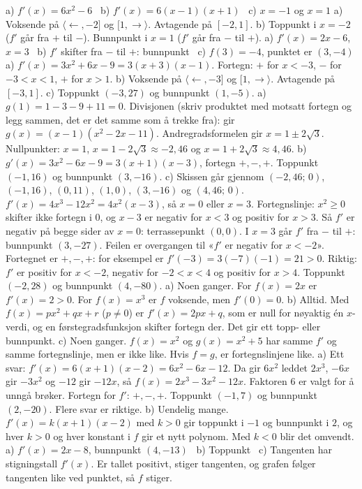 
 a) $f'(x) = 6x^2 - 6$ \ b) $f'(x) = 6(x - 1)(x + 1)$ \ c) $x = -1$ og $x = 1$
 a) Voksende på $\langle\leftarrow, -2]$ og $[1, \rightarrow\rangle$. Avtagende på $[-2, 1]$.
b) Toppunkt i $x = -2$ ($f'$ går fra $+$ til $-$). Bunnpunkt i $x = 1$ ($f'$ går fra $-$ til $+$).
 a) $f'(x) = 2x - 6$, $x = 3$ \ b) $f'$ skifter fra $-$ til $+$: bunnpunkt \ c) $f(3) = -4$, punktet er $(3, -4)$
 a) $f'(x) = 3x^2 + 6x - 9 = 3(x + 3)(x - 1)$. Fortegn: $+$ for $x < -3$, $-$ for $-3 < x < 1$, $+$ for $x > 1$.
b) Voksende på $\langle\leftarrow, -3]$ og $[1, \rightarrow\rangle$. Avtagende på $[-3, 1]$.
c) Toppunkt $(-3, 27)$ og bunnpunkt $(1, -5)$.
 a) $g(1) = 1 - 3 - 9 + 11 = 0$. Divisjonen (skriv produktet med motsatt fortegn og legg sammen, det er det samme som å trekke fra):
{\small{}}
gir $g(x) = (x - 1)(x^2 - 2x - 11)$. Andregradsformelen gir $x = 1 \pm 2\sqrt{3}$.
Nullpunkter: $x = 1$, $x = 1 - 2\sqrt{3} \approx -2,46$ og $x = 1 + 2\sqrt{3} \approx 4,46$.
b) $g'(x) = 3x^2 - 6x - 9 = 3(x + 1)(x - 3)$, fortegn $+, -, +$. Toppunkt $(-1, 16)$ og bunnpunkt $(3, -16)$.
c) Skissen går gjennom $(-2,46;\,0)$, $(-1, 16)$, $(0, 11)$, $(1, 0)$, $(3, -16)$ og $(4,46;\,0)$.
 $f'(x) = 4x^3 - 12x^2 = 4x^2(x - 3)$, så $x = 0$ eller $x = 3$. Fortegnslinje: $x^2 \ge 0$ skifter ikke fortegn i $0$, og $x - 3$ er negativ for $x < 3$ og positiv for $x > 3$.
Så $f'$ er negativ på begge sider av $x = 0$: terrassepunkt $(0, 0)$. I $x = 3$ går $f'$ fra $-$ til $+$: bunnpunkt $(3, -27)$.
 Feilen er overgangen til «$f'$ er negativ for $x < -2$». Fortegnet er $+, -, +$: for eksempel er $f'(-3) = 3(-7)(-1) = 21 > 0$.
Riktig: $f'$ er positiv for $x < -2$, negativ for $-2 < x < 4$ og positiv for $x > 4$. Toppunkt $(-2, 28)$ og bunnpunkt $(4, -80)$.
 a) Noen ganger. For $f(x) = 2x$ er $f'(x) = 2 > 0$. For $f(x) = x^3$ er $f$ voksende, men $f'(0) = 0$.
b) Alltid. Med $f(x) = px^2 + qx + r$ ($p \ne 0$) er $f'(x) = 2px + q$, som er null for nøyaktig én $x$-verdi, og en førstegradsfunksjon skifter fortegn der. Det gir ett topp- eller bunnpunkt.
c) Noen ganger. $f(x) = x^2$ og $g(x) = x^2 + 5$ har samme $f'$ og samme fortegnslinje, men er ikke like. Hvis $f = g$, er fortegnslinjene like.
 a) Ett svar: $f'(x) = 6(x + 1)(x - 2) = 6x^2 - 6x - 12$. Da gir $6x^2$ leddet $2x^3$, $-6x$ gir $-3x^2$ og $-12$ gir $-12x$, så $f(x) = 2x^3 - 3x^2 - 12x$. Faktoren $6$ er valgt for å unngå brøker. Fortegn for $f'$: $+, -, +$. Toppunkt $(-1, 7)$ og bunnpunkt $(2, -20)$. Flere svar er riktige.
b) Uendelig mange. $f'(x) = k(x + 1)(x - 2)$ med $k > 0$ gir toppunkt i $-1$ og bunnpunkt i $2$, og hver $k > 0$ og hver konstant i $f$ gir et nytt polynom. Med $k < 0$ blir det omvendt.
 a) $f'(x) = 2x - 8$, bunnpunkt $(4, -13)$ \ b) Toppunkt \ c) Tangenten har stigningstall $f'(x)$. Er tallet positivt, stiger tangenten, og grafen følger tangenten like ved punktet, så $f$ stiger.


